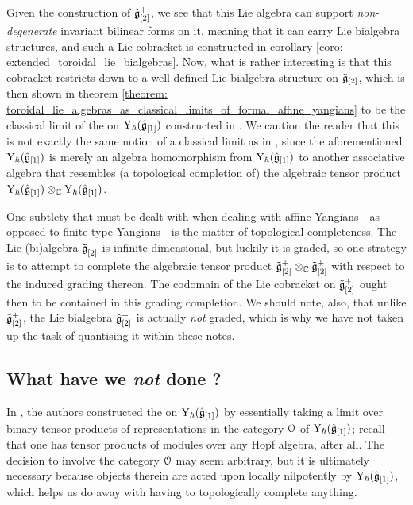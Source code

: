             Given the construction of $\hat{\mathfrak{g}}_{[2]}^+$, we see that this Lie algebra can support \textit{non-degenerate} invariant bilinear forms on it, meaning that it can carry Lie bialgebra structures, and such a Lie cobracket is constructed in corollary \ref{coro: extended_toroidal_lie_bialgebras}. Now, what is rather interesting is that this cobracket restricts down to a well-defined Lie bialgebra structure on $\tilde{\mathfrak{g}}_{[2]}$, which is then shown in theorem \ref{theorem: toroidal_lie_algebras_as_classical_limits_of_formal_affine_yangians} to be the classical limit of the  on $\mathrm{Y}_{\hbar}(\hat{\mathfrak{g}}_{[1]})$ constructed in \cite{guay_nakajima_wendlandt_affine_yangian_coproduct}. We caution the reader that this is not exactly the same notion of a classical limit as in \cite{etingof_kazhdan_quantisation_1}, since the aforementioned  $\mathrm{Y}_{\hbar}(\hat{\mathfrak{g}}_{[1]})$ is merely an algebra homomorphism from $\mathrm{Y}_{\hbar}(\hat{\mathfrak{g}}_{[1]})$ to another associative algebra that resembles (a topological completion of) the algebraic tensor product $\rmY_{\hbar}(\hat{\g}_{[1]}) \tensor_{\bbC} \rmY_{\hbar}(\hat{\g}_{[1]})$. 

            One subtlety that must be dealt with when dealing with affine Yangians - as opposed to finite-type Yangians - is the matter of topological completeness. The Lie (bi)algebra $\tilde{\mathfrak{g}}_{[2]}^+$ is infinite-dimensional, but luckily it is graded, so one strategy is to attempt to complete the algebraic tensor product $\tilde{\g}_{[2]}^+ \tensor_{\bbC} \tilde{\g}_{[2]}^+$ with respect to the induced grading thereon. The codomain of the Lie cobracket on $\tilde{\mathfrak{g}}_{[2]}^+$ ought then to be contained in this grading completion. We should note, also, that unlike $\tilde{\mathfrak{g}}_{[2]}^+$, the Lie bialgebra $\hat{\mathfrak{g}}_{[2]}^+$ is actually \textit{not} graded, which is why we have not taken up the task of quantising it within these notes. 

        \subsection{What have we \textit{not} done ?}
            In \cite{guay_nakajima_wendlandt_affine_yangian_coproduct}, the authors constructed the  on $\mathrm{Y}_{\hbar}(\hat{\mathfrak{g}}_{[1]})$ by essentially taking a limit over binary tensor products of representations in the category $\mathcal{O}$ of $\mathrm{Y}_{\hbar}(\hat{\mathfrak{g}}_{[1]})$; recall that one has tensor products of modules over any Hopf algebra, after all. The decision to involve the category $\mathcal{O}$ may seem arbitrary, but it is ultimately necessary because objects therein are acted upon locally nilpotently by $\mathrm{Y}_{\hbar}(\hat{\mathfrak{g}}_{[1]})$, which helps us do away with having to topologically complete anything. 
        
